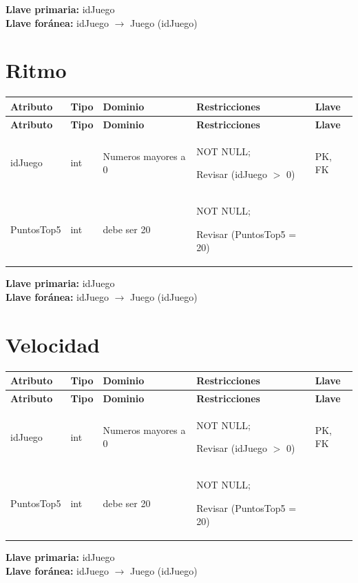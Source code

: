 \documentclass[12pt]{article}
\begin{document}
\vspace{2pt}
\textbf{Llave primaria:} idJuego\\
\textbf{Llave foránea:} idJuego $\rightarrow$ Juego (idJuego)\\


\section*{Ritmo}

\begin{longtable}{p{3.2cm} p{2.2cm} p{4.8cm} p{4.2cm} p{1.2cm}}
\label{tab:ritmo}\\
\toprule
\textbf{Atributo} & \textbf{Tipo} & \textbf{Dominio} & \textbf{Restricciones} & \textbf{Llave} \\
\midrule
\endfirsthead

\toprule
\textbf{Atributo} & \textbf{Tipo} & \textbf{Dominio} & \textbf{Restricciones} & \textbf{Llave} \\
\midrule
\endhead

\bottomrule
\endfoot

idJuego 
& int
& Numeros mayores a 0
& NOT NULL;

Revisar (idJuego $>$ 0)
& PK, FK \\

PuntosTop5 
& int
& debe ser 20
& NOT NULL;

Revisar (PuntosTop5 = 20)
& \\

\end{longtable}

\vspace{2pt}
\textbf{Llave primaria:} idJuego\\
\textbf{Llave foránea:} idJuego $\rightarrow$ Juego (idJuego)\\


\section*{Velocidad}

\begin{longtable}{p{3.2cm} p{2.2cm} p{4.8cm} p{4.2cm} p{1.2cm}}
\label{tab:velocidad}\\
\toprule
\textbf{Atributo} & \textbf{Tipo} & \textbf{Dominio} & \textbf{Restricciones} & \textbf{Llave} \\
\midrule
\endfirsthead

\toprule
\textbf{Atributo} & \textbf{Tipo} & \textbf{Dominio} & \textbf{Restricciones} & \textbf{Llave} \\
\midrule
\endhead

\bottomrule
\endfoot

idJuego 
& int
& Numeros mayores a 0
& NOT NULL;

Revisar (idJuego $>$ 0)
& PK, FK \\

PuntosTop5 
& int
& debe ser 20
& NOT NULL;

Revisar (PuntosTop5 = 20)
& \\

\end{longtable}

\vspace{2pt}
\textbf{Llave primaria:} idJuego\\
\textbf{Llave foránea:} idJuego $\rightarrow$ Juego (idJuego)\\
\end{document}
